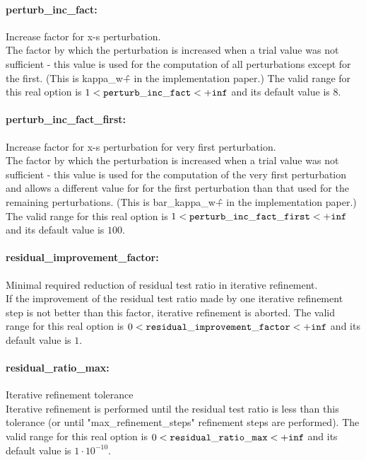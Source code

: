 \paragraph{perturb\_inc\_fact:}\label{opt:perturb_inc_fact} Increase factor for x-s perturbation. \\
 The factor by which the perturbation is increased when a trial value was not sufficient - this value is used for the computation of all perturbations except for the first. (This is kappa\_w\^+ in the implementation paper.) The valid range for this real option is 
$1 <  {\tt perturb\_inc\_fact } <  {\tt +inf}$
and its default value is $8$.


\paragraph{perturb\_inc\_fact\_first:}\label{opt:perturb_inc_fact_first} Increase factor for x-s perturbation for very first perturbation. \\
 The factor by which the perturbation is increased when a trial value was not sufficient - this value is used for the computation of the very first perturbation and allows a different value for for the first perturbation than that used for the remaining perturbations. (This is bar\_kappa\_w\^+ in the implementation paper.) The valid range for this real option is 
$1 <  {\tt perturb\_inc\_fact\_first } <  {\tt +inf}$
and its default value is $100$.


\paragraph{residual\_improvement\_factor:}\label{opt:residual_improvement_factor} Minimal required reduction of residual test ratio in iterative refinement. \\
 If the improvement of the residual test ratio made by one iterative refinement step is not better than this factor, iterative refinement is aborted. The valid range for this real option is 
$0 <  {\tt residual\_improvement\_factor } <  {\tt +inf}$
and its default value is $1$.


\paragraph{residual\_ratio\_max:}\label{opt:residual_ratio_max} Iterative refinement tolerance \\
 Iterative refinement is performed until the residual test ratio is less than this tolerance (or until "max\_refinement\_steps" refinement steps are performed). The valid range for this real option is 
$0 <  {\tt residual\_ratio\_max } <  {\tt +inf}$
and its default value is $1 \cdot 10^{-10}$.


